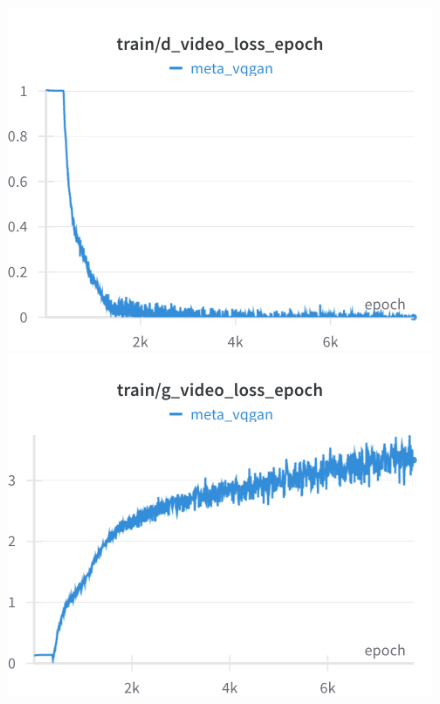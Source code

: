 \begin{figure}[H]
\includegraphics[width=\linewidth]{detailed_engineering/Meta VQGAN/charts/Section-2-Panel-14-gje285wxz}
\caption{}
\endminipage\hfill
{}
\includegraphics[width=\linewidth]{detailed_engineering/Meta VQGAN/charts/Section-2-Panel-15-a3xyy64w1}
\caption{}
\endminipage
\end{figure}

